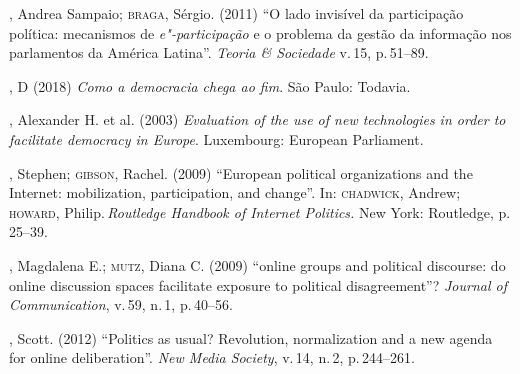 \begin{bibliohedra}
, Andrea Sampaio; \textsc{braga}, Sérgio. (2011) ``O lado invisível da
participação política: mecanismos de \textit{e"-participação} e o problema da
gestão da informação nos parlamentos da América Latina''. \textit{Teoria
\& Sociedade} v.\,15, p.\,51--89.

, D (2018) \textit{Como a democracia chega ao fim}. São Paulo:
Todavia.

, Alexander H. et al. (2003) \textit{Evaluation of the use of new
technologies in order to facilitate democracy in Europe}. Luxembourg:
European Parliament. 

, Stephen; \textsc{gibson}, Rachel. (2009) ``European political organizations
and the Internet: mobilization, participation, and change''. In:
\textsc{chadwick}, Andrew; \textsc{howard}, Philip.\,\textit{Routledge Handbook of Internet
Politics.} New York: Routledge, p.\,25--39.

, Magdalena E.; \textsc{mutz}, Diana C. (2009) ``online groups and
political discourse: do online discussion spaces facilitate exposure to
political disagreement''? \textit{Journal of Communication}, v.\,59, n.\,1,
p.\,40--56.

, Scott. (2012) ``Politics as usual? Revolution, normalization and
a new agenda for online deliberation''. \textit{New Media Society}, v.\,14, n.\,2, p.\,244--261.
\end{bibliohedra}


\begin{flushright}
\end{flushright}



